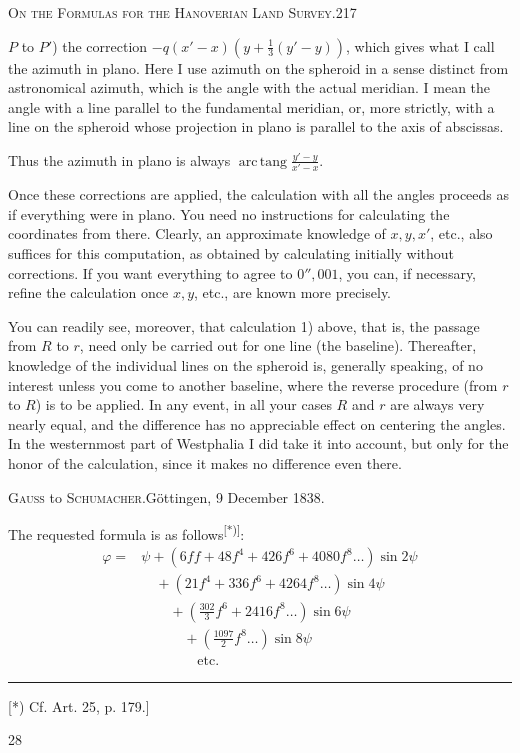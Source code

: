 \par\clearpage
\noindent\mbox{}\hfill{\small\textsc{On the Formulas for the Hanoverian Land Survey.}}\hfill217\par\medskip
\noindent \(P\) to \(P'\)) the correction \(-q(x'-x)(y+\frac13(y'-y))\), which gives what I call the azimuth in plano. Here I use azimuth on the spheroid in a sense distinct from astronomical azimuth, which is the angle with the actual meridian. I mean the angle with a line parallel to the fundamental meridian, or, more strictly, with a line on the spheroid whose projection in plano is parallel to the axis of abscissas.

Thus the azimuth in plano is always \(\operatorname{arc\,tang}\frac{y'-y}{x'-x}\).

Once these corrections are applied, the calculation with all the angles proceeds as if everything were in plano. You need no instructions for calculating the coordinates from there. Clearly, an approximate knowledge of \(x,y,x'\), etc., also suffices for this computation, as obtained by calculating initially without corrections. If you want everything to agree to \(0''{,}001\), you can, if necessary, refine the calculation once \(x,y\), etc., are known more precisely.

You can readily see, moreover, that calculation 1) above, that is, the passage from \(R\) to \(r\), need only be carried out for one line (the baseline). Thereafter, knowledge of the individual lines on the spheroid is, generally speaking, of no interest unless you come to another baseline, where the reverse procedure (from \(r\) to \(R\)) is to be applied. In any event, in all your cases \(R\) and \(r\) are always very nearly equal, and the difference has no appreciable effect on centering the angles. In the westernmost part of Westphalia I did take it into account, but only for the honor of the calculation, since it makes no difference even there.
\begin{center}\textsc{Gauss} to \textsc{Schumacher}.\quad Göttingen, 9 December 1838.\end{center}
The requested formula is as follows\textsuperscript{[*)]}:
\[
\begin{aligned}
\varphi={}&\psi+(6ff+48f^4+426f^6+4080f^8\ldots)\sin2\psi\\
&\quad+(21f^4+336f^6+4264f^8\ldots)\sin4\psi\\
&\qquad+\left(\frac{302}3f^6+2416f^8\ldots\right)\sin6\psi\\
&\qquad\quad+\left(\frac{1097}2f^8\ldots\right)\sin8\psi\\
&\qquad\qquad\text{etc.}
\end{aligned}
\]
\par\noindent\rule{4cm}{.4pt}\par
{\footnotesize\noindent\hspace*{\parindent}[*) Cf. Art. 25, p. 179.]\par}
\hfill28\hspace*{.12\linewidth}\par

